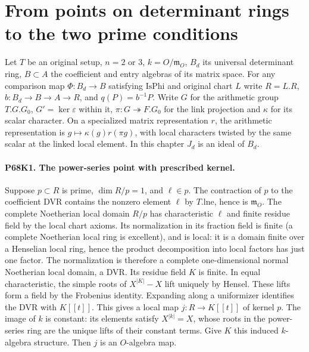 \section{From points on determinant rings to the two prime conditions}

Let $T$ be an original setup, $n=2$ or $3$, $k=O/\mathfrak m_O$,
$B_d$ its universal determinant ring, $B\subset A$ the coefficient
and entry algebras of its matrix space. For any comparison map
$\Phi:B_d\to B$ satisfying $\mathrm{IsPhi}$ and original chart
$L$ write $R=L.R$, $b:B_d\to B\to A\to R$, and
$q(P)=b^{-1}P$. Write $G$ for the arithmetic group $T.G.G_0$,
$G'=\ker\varepsilon$ within it, $\pi:G\twoheadrightarrow F.G_0$
for the link projection and $\kappa$ for its scalar character.
On a specialized matrix representation $r$, the arithmetic
representation is $g\mapsto\kappa(g)r(\pi g)$, with local
characters twisted by the same scalar at the linked local element.
In this chapter $J_d$ is an ideal of $B_d$.

\paragraph{P68K1. The power-series point with prescribed kernel.}
Suppose $p\subset R$ is prime, $\dim R/p=1$, and $\ell\in p$.
The contraction of $p$ to the coefficient DVR contains the nonzero
element $\ell$ by $T.\mathrm{lne}$, hence is $\mathfrak m_O$.
The complete Noetherian local domain $R/p$ has characteristic
$\ell$ and finite residue field by the local chart axioms. Its
normalization in its fraction field is finite (a complete
Noetherian local ring is excellent), and is local: it is a
domain finite over a Henselian local ring, hence the product
decomposition into local factors has just one factor. The
normalization is therefore a complete one-dimensional normal
Noetherian local domain, a DVR. Its residue field $K$ is finite.
In equal characteristic, the simple roots of $X^{|K|}-X$ lift
uniquely by Hensel. These lifts form a field by the Frobenius
identity. Expanding along a uniformizer identifies the DVR with
$K[[t]]$. This gives a local map $j:R\to K[[t]]$ of kernel $p$.
The image of $k$ is constant: its elements satisfy
$X^{|k|}=X$, whose roots in the power-series ring are the
unique lifts of their constant terms. Give $K$ this induced
$k$-algebra structure. Then $j$ is an $O$-algebra map.

